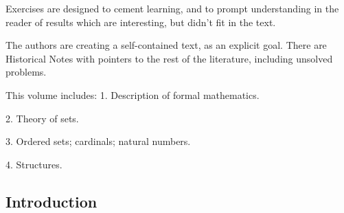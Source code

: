 \documentclass[]{scrartcl}
\begin{document}
Exercises are designed to cement learning, and to prompt understanding in the reader of results which are interesting, but didn't fit in the text.

The authors are creating a self-contained text, as an explicit goal. There are Historical Notes with pointers to the rest of the literature, including unsolved problems.

This volume includes:
1. Description of formal mathematics.

2. Theory of sets.

3. Ordered sets; cardinals; natural numbers.

4. Structures.

\subsection{Introduction}
\end{document}
